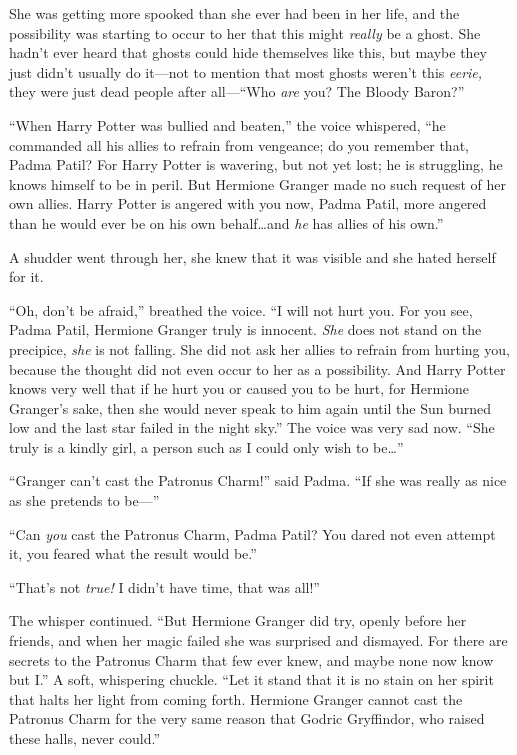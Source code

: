 She was getting more spooked than she ever had been in her life, and the possibility was starting to occur to her that this might \emph{really} be a ghost. She hadn’t ever heard that ghosts could hide themselves like this, but maybe they just didn’t usually do it—not to mention that most ghosts weren’t this \emph{eerie,} they were just dead people after all—“Who \emph{are} you? The Bloody Baron?”

“When Harry Potter was bullied and beaten,” the voice whispered, “he commanded all his allies to refrain from vengeance; do you remember that, Padma Patil? For Harry Potter is wavering, but not yet lost; he is struggling, he knows himself to be in peril. But Hermione Granger made no such request of her own allies. Harry Potter is angered with you now, Padma Patil, more angered than he would ever be on his own behalf…and \emph{he} has allies of his own.”

A shudder went through her, she knew that it was visible and she hated herself for it.

“Oh, don’t be afraid,” breathed the voice. “I will not hurt you. For you see, Padma Patil, Hermione Granger truly is innocent. \emph{She} does not stand on the precipice, \emph{she} is not falling. She did not ask her allies to refrain from hurting you, because the thought did not even occur to her as a possibility. And Harry Potter knows very well that if he hurt you or caused you to be hurt, for Hermione Granger’s sake, then she would never speak to him again until the Sun burned low and the last star failed in the night sky.” The voice was very sad now. “She truly is a kindly girl, a person such as I could only wish to be…”

“Granger can’t cast the Patronus Charm!” said Padma. “If she was really as nice as she pretends to be—”

“Can \emph{you} cast the Patronus Charm, Padma Patil? You dared not even attempt it, you feared what the result would be.”

“That’s not \emph{true!} I didn’t have time, that was all!”

The whisper continued. “But Hermione Granger did try, openly before her friends, and when her magic failed she was surprised and dismayed. For there are secrets to the Patronus Charm that few ever knew, and maybe none now know but I.” A soft, whispering chuckle. “Let it stand that it is no stain on her spirit that halts her light from coming forth. Hermione Granger cannot cast the Patronus Charm for the very same reason that Godric Gryffindor, who raised these halls, never could.”

